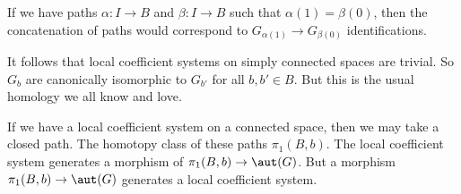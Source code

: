 If we have paths $\alpha\colon I\to B$ and $\beta\colon I\to B$
such that $\alpha(1)=\beta(0)$, then the concatenation of paths
would correspond to $G_{\alpha(1)}\to G_{\beta(0)}$
identifications.

It follows that local coefficient systems on simply connected
spaces are trivial. So $G_{b}$ are canonically isomorphic to
$G_{b'}$ for all $b,b'\in B$. But this is the usual homology we
all know and love.

If we have a local coefficient system on a connected space, then
we may take a closed path. The homotopy class of these paths
$\pi_{1}(B,b)$. The local coefficient system generates a morphism
of $\pi_{1}(B,b)\to\aut(G)$. But a morphism
$\pi_{1}(B,b)\to\aut(G)$ generates a local coefficient system.

